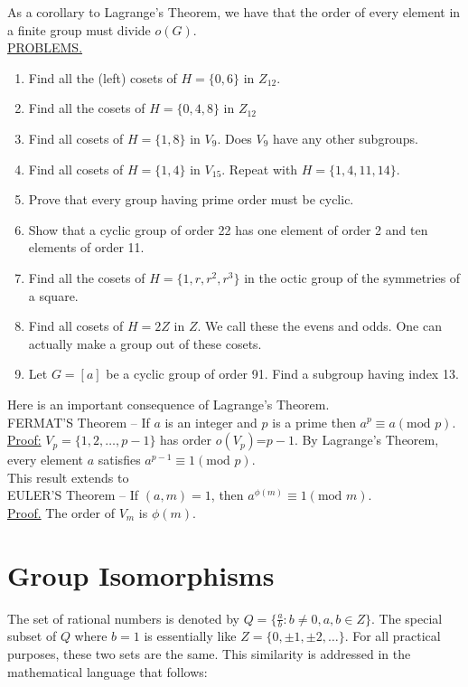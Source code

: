 \documentclass[12pt]{book}
\theoremstyle{definition}
\begin{document}
As a corollary to Lagrange's Theorem, we have that the order of every element in a finite group must divide $o(G)$.\\
\underline{PROBLEMS.}
\begin{enumerate}
\item Find all the (left) cosets of $H=\{0,6\} $ in $Z_{12}$.
\item Find all the cosets of $H=\{0,4,8\}$ in $Z_{12}$
\item Find all cosets of $H=\{1,8\}$ in $V_9$.  Does $V_9$ have any other subgroups.
\item Find all cosets of $H=\{1,4\}$ in $V_{15}$.  Repeat with $H=\{1,4,11,14\}$.
\item Prove that every group having prime order must be cyclic.
\item Show that a cyclic group of order 22 has one element of order 2 and ten elements of order 11.
\item Find all the cosets of $H=\{1,r,r^2,r^3\}$ in the octic group of the symmetries of a square.
\item Find all cosets of $H=2Z$ in $Z$.  We call these the evens and odds.  One can actually make a group out of these cosets.
\item Let $G=[a]$ be a cyclic group of order 91.  Find a subgroup having index 13.
\end{enumerate}
%
Here is an important consequence of Lagrange's Theorem.\\[.1in]
%
FERMAT'S Theorem -- If $a$ is an integer and $p$ is a prime then $a^p \equiv a(\text{mod } p)$.\\
%
\underline{Proof:} $V_p=\{1,2,\dots,p-1\}$ has order $o(V_p)$=$p-1$.  By Lagrange's Theorem, every element $a$ satisfies $a^{p-1}\equiv 1(\text{mod }p)$.\\[.1in]
%
This result extends to\\
%
EULER'S Theorem -- If $(a,m)=1$, then $a^{\phi(m)}\equiv 1(\text{mod }m)$.\\
%
\underline{Proof.} The order of $V_m$ is $\phi(m)$.

\section{Group Isomorphisms}
\quad The set of rational numbers is denoted by $Q=\{\frac{a}{b}:b\neq0, a,b \in Z\}$.  The special subset of $Q$ where $b=1$ is essentially like $Z=\{0,\pm1,\pm2, \dots\}$.  For all practical purposes, these two sets are the same.  This similarity is addressed in the mathematical language that follows:
\end{document}
